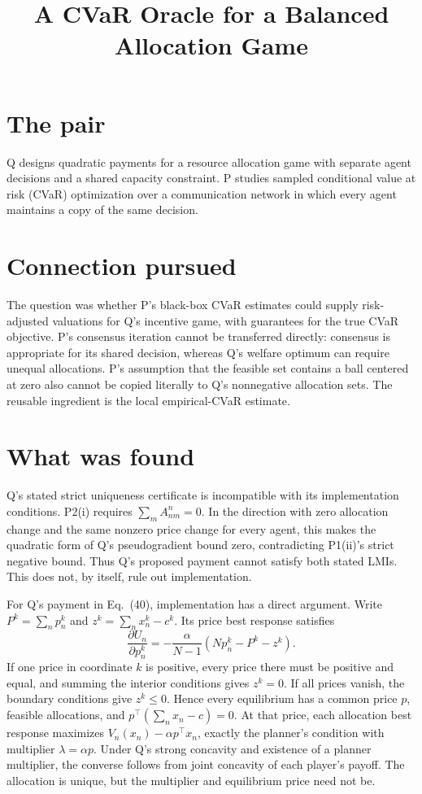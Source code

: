 \documentclass{article}
\title{A CVaR Oracle for a Balanced Allocation Game}
\begin{document}
\maketitle

\section{The pair}

Q designs quadratic payments for a resource allocation game with separate agent decisions and a shared capacity constraint. P studies sampled conditional value at risk (CVaR) optimization over a communication network in which every agent maintains a copy of the same decision. 

\section{Connection pursued}

The question was whether P's black-box CVaR estimates could supply risk-adjusted valuations for Q's incentive game, with guarantees for the true CVaR objective. P's consensus iteration cannot be transferred directly: consensus is appropriate for its shared decision, whereas Q's welfare optimum can require unequal allocations. P's assumption that the feasible set contains a ball centered at zero also cannot be copied literally to Q's nonnegative allocation sets. The reusable ingredient is the local empirical-CVaR estimate. 

\section{What was found}

\begin{objection}
Q's stated strict uniqueness certificate is incompatible with its implementation conditions. P2(i) requires \(\sum_m A_{nm}^n=0\). In the direction with zero allocation change and the same nonzero price change for every agent, this makes the quadratic form of Q's pseudogradient bound zero, contradicting P1(ii)'s strict negative bound. Thus Q's proposed payment cannot satisfy both stated LMIs. This does not, by itself, rule out implementation. 
\end{objection}

For Q's payment in Eq.~(40), implementation has a direct argument. Write \(P^k=\sum_n p_n^k\) and \(z^k=\sum_n x_n^k-c^k\). Its price best response satisfies
\[
\frac{\partial U_n}{\partial p_n^k}
=-\frac{\alpha}{N-1}(Np_n^k-P^k-z^k).
\]
If one price in coordinate \(k\) is positive, every price there must be positive and equal, and summing the interior conditions gives \(z^k=0\). If all prices vanish, the boundary conditions give \(z^k\leq0\). Hence every equilibrium has a common price \(p\), feasible allocations, and \(p^\top(\sum_nx_n-c)=0\). At that price, each allocation best response maximizes \(V_n(x_n)-\alpha p^\top x_n\), exactly the planner's condition with multiplier \(\lambda=\alpha p\). Under Q's strong concavity and existence of a planner multiplier, the converse follows from joint concavity of each player's payoff. The allocation is unique, but the multiplier and equilibrium price need not be. 
\end{document}
